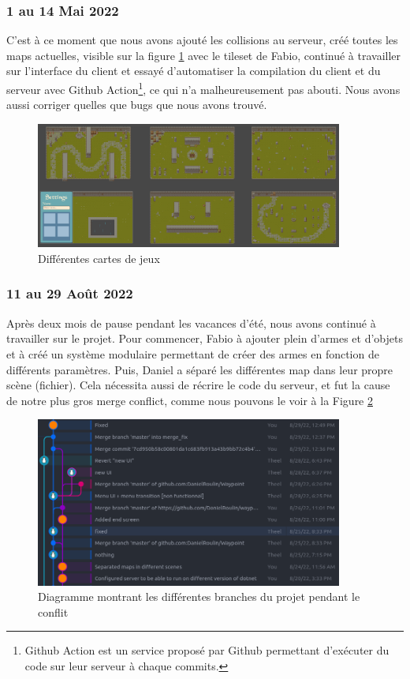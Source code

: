 \documentclass[a4paper]{article}
\begin{document}
\subsubsection{1 au 14 Mai 2022}
C'est à ce moment que nous avons ajouté les collisions au serveur, créé toutes les maps actuelles, visible sur la figure \ref{fig:maps} avec le tileset\cite{tileset} de Fabio, continué à travailler sur l'interface du client et essayé d'automatiser la compilation du client et du serveur avec Github Action\footnote{Github Action est un service proposé par Github permettant d'exécuter du code sur leur serveur à chaque commits.},  ce qui n'a malheureusement pas abouti. Nous avons aussi corriger quelles que bugs que nous avons trouvé.

\begin{figure}
	\centering
    \includegraphics[width=0.9\textwidth]{images/game/maps.png}
    \caption{Différentes cartes de jeux}
    \label{fig:maps}
\end{figure}


\subsubsection{11 au 29 Août 2022}
Après deux mois de pause pendant les vacances d'été, nous avons continué à travailler sur le projet. Pour commencer, Fabio à ajouter plein d'armes et d'objets et à créé un système modulaire permettant de créer des armes en fonction de différents paramètres. Puis, Daniel a séparé les différentes map dans leur propre scène (fichier). Cela nécessita aussi de récrire le code du serveur, et fut la cause de notre plus gros merge conflict, comme nous pouvons le voir à la Figure \ref{fig:conflict}

\begin{figure}
	\centering
    \includegraphics[width=0.9\textwidth]{images/conflict.png}
    \caption{Diagramme montrant les différentes branches du projet pendant le conflit}
    \label{fig:conflict}
\end{figure}
\end{document}
